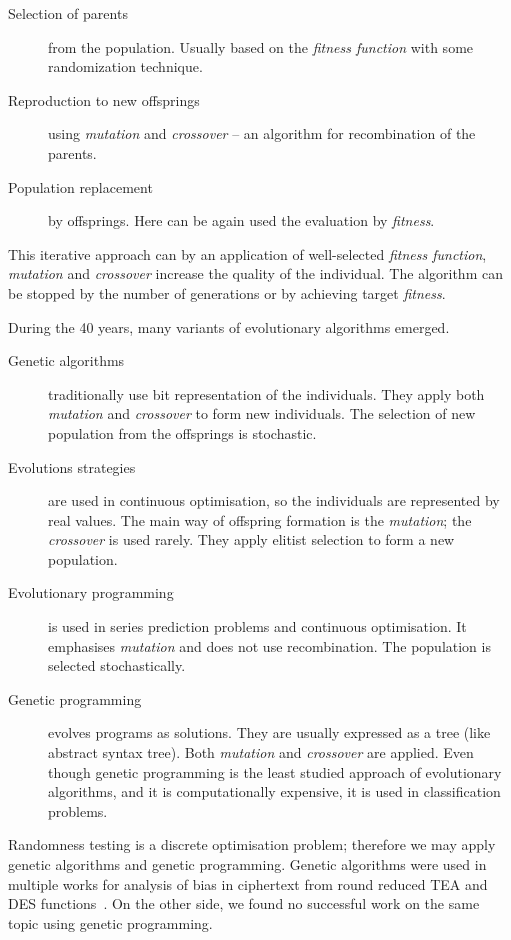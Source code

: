 \documentclass[
    digital,    %
    oneside,    %
    color,
    11pt,
    nocover,
    notable,
    nolof,
    nolot,
]{fithesis3}
\begin{document}
\begin{description}
    \item[Selection of parents] from the population. Usually based on the \textit{fitness function} with some randomization technique.
    \item[Reproduction to new offsprings] using \textit{mutation} and \textit{crossover} -- an algorithm for recombination of the parents.
    \item[Population replacement] by offsprings. Here can be again used the evaluation by \textit{fitness}. 
\end{description}

This iterative approach can by an application of well-selected \textit{fitness function}, \textit{mutation} and \textit{crossover} increase the quality of the individual. The algorithm can be stopped by the number of generations or by achieving target \textit{fitness}.

During the 40 years, many variants of evolutionary algorithms emerged.

\begin{description}
    \item[Genetic algorithms] traditionally use bit representation of the individuals. They apply both \textit{mutation} and \textit{crossover} to form new individuals. The selection of new population from the offsprings is stochastic.
    \item[Evolutions strategies] are used in continuous optimisation, so the individuals are represented by real values. The main way of offspring formation is the \textit{mutation}; the \textit{crossover} is used rarely. They apply elitist selection to form a new population.
    \item[Evolutionary programming] is used in series prediction problems and continuous optimisation. It emphasises \textit{mutation} and does not use recombination. The population is selected stochastically.
    \item[Genetic programming] evolves programs as solutions. They are usually expressed as a tree (like abstract syntax tree). Both \textit{mutation} and \textit{crossover} are applied. Even though genetic programming is the least studied approach of evolutionary algorithms, and it is computationally expensive, it is used in classification problems.
\end{description}

Randomness testing is a discrete optimisation problem; therefore we may apply genetic algorithms and genetic programming. Genetic algorithms were used in multiple works for analysis of bias in ciphertext from round reduced TEA and DES functions~\cite{twoRoundsTea,fourRoundsTea,fiveRoundsTea,song2007cryptanalysis,husein2007genetic}. On the other side, we found no successful work on the same topic using genetic programming.
\end{document}
